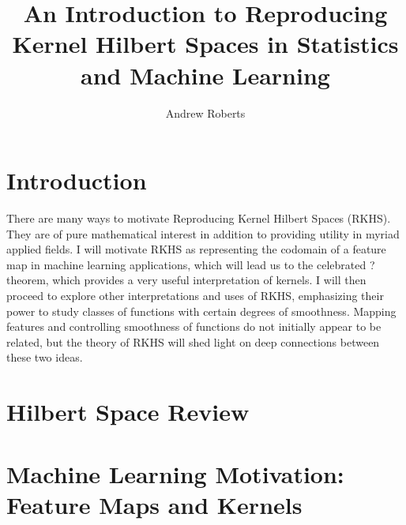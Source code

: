 \documentclass[12pt]{article}
\title{An Introduction to Reproducing Kernel Hilbert Spaces in Statistics and Machine Learning}
\author{Andrew Roberts}
\begin{document}
\maketitle
\tableofcontents
\newpage

\section{Introduction}
There are many ways to motivate Reproducing Kernel Hilbert Spaces (RKHS). They are of pure mathematical interest in addition to providing utility in myriad applied fields. I will motivate RKHS as 
representing the codomain of a feature map in machine learning applications, which will lead us to the celebrated ? theorem, which provides a very useful interpretation of kernels. I will then proceed to 
explore other interpretations and uses of RKHS, emphasizing their power to study classes of functions with certain degrees of smoothness. Mapping features and controlling smoothness of functions do not 
initially appear to be related, but the theory of RKHS will shed light on deep connections between these two ideas. 

\section{Hilbert Space Review}

\section{Machine Learning Motivation: Feature Maps and Kernels}
\end{document}
